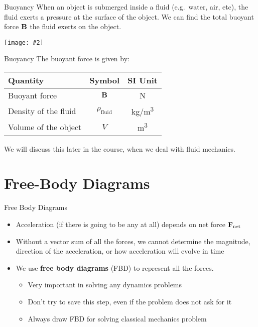 \documentclass[12pt,compress,aspectratio=169]{beamer}
\newcommand{\pic}[2]{\texttt{[image: \#2]}}
\newcommand{\mb}[1]{\ensuremath\mathbf{#1}}
\newcommand{\eq}[2]{\vspace{#1}{\Large\begin{displaymath}#2\end{displaymath}}}
\begin{document}
\begin{frame}{Buoyancy}
  When an object is submerged inside a fluid (e.g.\ water, air, etc), the fluid
  exerts a pressure at the surface of the object. We can find the total buoyant 
  force $\mb{B}$ the fluid exerts on the object.
  \begin{center}
    \pic{.4}{graphics/rock_fbvectors}
  \end{center}
\end{frame}



\begin{frame}{Buoyancy}
  The buoyant force is given by:
  
  \eq{-.1in}{
    \boxed{\mb{B}=\rho_\text{fluid}gV\bm{\hat{k}}}
  }
  \begin{center}
    \begin{tabular}{l|c|c}
      \rowcolor{pink}
      \textbf{Quantity} & \textbf{Symbol} & \textbf{SI Unit} \\ \hline
      Buoyant force & $\mb{B}$  & \si{\newton} \\
      Density of the fluid & $\rho_\text{fluid}$ & \si{\kg/\m\cubed}\\
      Volume of the object & $V$ & \si{\metre\cubed}
    \end{tabular}
  \end{center}
  We will discuss this later in the course, when we deal with fluid mechanics.
\end{frame}



\section{Free-Body Diagrams}


\begin{frame}{Free Body Diagrams}
  \begin{itemize}
  \item Acceleration (if there is going to be any at all) depends
    on net force $\mb{F}_\text{net}$
  \item Without a vector sum of all the forces, we cannot determine the
    magnitude, direction of the acceleration, or how acceleration will evolve
    in time
  \item We use \textbf{free body diagrams} (FBD) to represent all the forces.
    \begin{itemize}
    \item Very important in solving any dynamics problems
    \item Don't try to save this step, even if the problem does not ask for it
    \item Always draw FBD for solving classical mechanics problem
    \end{itemize}
  \end{itemize}
\end{frame}
\end{document}
